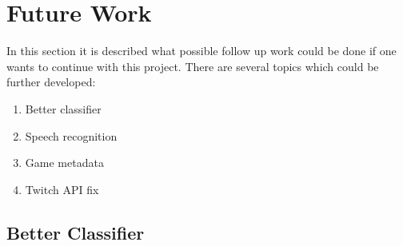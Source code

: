 \documentclass[final]{report}
\begin{document}
\chapter{Future Work}
\label{ch:Future Work}

In this section it is described what possible follow up work could be done if one wants to continue with this project. There are several topics which could be further developed:

\begin{enumerate}
	\item Better classifier
	\item Speech recognition
	\item Game metadata
	\item Twitch API fix
\end{enumerate}

\section{Better Classifier}
\end{document}

